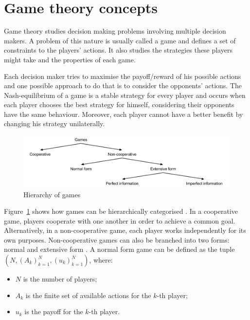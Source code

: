 \section{Game theory concepts}

Game theory studies decision making problems involving multiple decision makers.
A problem of this nature is usually called a game and defines a set of constraints to the players' actions.
It also studies the strategies these players might take and the properties of each game.

Each decision maker tries to maximise the payoff/reward of his possible actions and one possible approach to do that is to consider the opponents' actions.
The Nash-equilibrium \cite{Nash1950} of a game is a stable strategy for every player and occurs when each player chooses the best strategy for himself, considering their opponents have the same behaviour.
Moreover, each player cannot have a better benefit by changing his strategy unilaterally.

\begin{figure}
\centering
\includegraphics[width=1\textwidth]{./img/gamesHierarchy}
\caption{Hierarchy of games}
\label{fig:games}
\end{figure}

Figure~\ref{fig:games} shows how games can be hierarchically categorised \cite{Osborne2011}.
In a cooperative game, players cooperate with one another in order to achieve a common goal.
Alternatively, in a non-cooperative game, each player works independently for its own purposes.
Non-cooperative games can also be branched into two forms: normal and extensive form \cite{Shoham2010}.
A normal form game can be defined as the tuple $(N,(A_k)_{k=1}^{N},(u_k)_{k=1}^{N})$, where:

\begin{itemize}
\item $N$ is the number of players;
\item $A_k$ is the finite set of available actions for the $k$-th player;
\item $u_k$ is the payoff for the $k$-th player.
\end{itemize}

